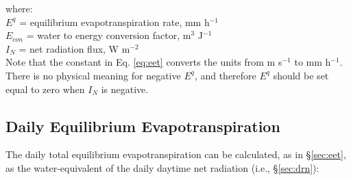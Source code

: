 \noindent where:\\
\indent $E^q$ = equilibrium evapotranspiration rate, mm h$^{-1}$\\
\indent $E_{con}$ = water to energy conversion factor, m$^{3}$ J$^{-1}$\\
\indent $I_N$ = net radiation flux, W m$^{-2}$ \\

\noindent Note that the constant in Eq. \ref{eq:eet} converts the units from m s$^{-1}$ to mm h$^{-1}$. 
There is no physical meaning for negative $E^q$, and therefore $E^q$ should be set equal to zero when $I_N$ is negative. 

\subsection{Daily Equilibrium Evapotranspiration}
\label{sec:deet}
The daily total equilibrium evapotranspiration can be calculated, as in \S \ref{sec:eet}, as the water-equivalent of the daily daytime net radiation (i.e., \S \ref{sec:drn}):

